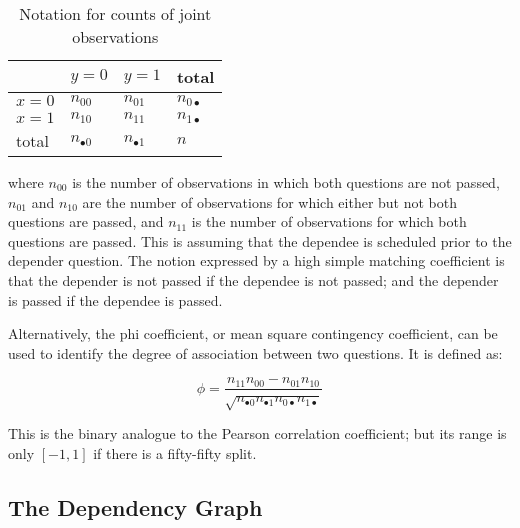 
\begin{table}
 \caption{Notation for counts of joint observations}
 \vspace{12pt}
 \begin{tabularx}{\textwidth}{|X|X|X|X|}
 \hline
        & \y $y=0$         & \y $y=1$         & \y total     \\ \hline
  \y $x=0$ & $n_{00}$      & $n_{01}$      & $n_{0 \bullet }$  \\ \hline
  \y $x=1$ & $n_{10}$      & $n_{11}$      & $n_{1 \bullet }$  \\ \hline
  \y total & $n_{\bullet 0}$ & $n_{\bullet 1}$ & $n$                \\ \hline
 \end{tabularx}
\vspace{24pt}
\end{table}

\begin{equations}
\end{equations}

where $n_{00}$ is the number of observations in which both questions are not
passed, $n_{01}$ and $n_{10}$ are the number of observations for which either
but not both questions are passed, and $n_{11}$ is the number of observations
for which both questions are passed.  This is assuming that the dependee is
scheduled prior to the depender question.  The notion expressed by a high
simple matching coefficient is that the depender is not passed if the dependee
is not passed; and the depender is passed if the dependee is passed.  

Alternatively, the phi coefficient, or mean square contingency coefficient,
can be used to identify the degree of association between two questions.
It is defined as:

\begin{equation}
 \phi = \frac{n_{11}n_{00} - n_{01}n_{10}}
 { 
   \sqrt{ n_{\bullet 0} n_{\bullet 1} n_{0 \bullet} n_{1 \bullet} } 
 }
\end{equation}

This is the binary analogue to the Pearson correlation coefficient; but its
range is only $[-1, 1]$ if there is a fifty-fifty split.  


\subsection{The Dependency Graph}

